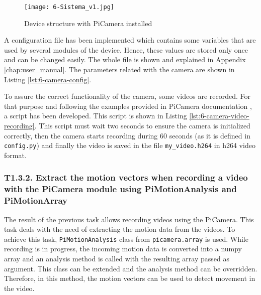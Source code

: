\begin{figure}[!h]
	\begin{center}
		\texttt{[image: 6-Sistema\_v1.jpg]}
		\caption{Device structure with PiCamera installed}
		\label{fig:6-Sistema_v1}
	\end{center}
\end{figure}

A configuration file has been implemented which contains some variables that are used by several modules of the device. Hence, these values are stored only once and can be changed easily. The whole file is shown and explained in Appendix \ref{chap:user_manual}. The parameters related with the camera are shown in Listing \ref{lst:6-camera-config}.



To assure the correct functionality of the camera, some videos are recorded. For that purpose and following the examples provided in PiCamera documentation \cite{PiCameraDoc}, a script has been developed. This script is shown in Listing \ref{lst:6-camera-video-recording}. This script must wait two seconds to ensure the camera is initialized correctly, then the camera starts recording during 60 seconds (as it is defined in \texttt{config.py}) and finally the video is saved in the file \texttt{my\_video.h264} in h264 video format.




\subsubsection{T1.3.2. Extract the motion vectors when recording a video with the PiCamera module using PiMotionAnalysis and PiMotionArray}
The result of the previous task allows recording videos using the PiCamera. This task deals with the need of extracting the motion data from the videos. To achieve this task, \texttt{PiMotionAnalysis} class from \texttt{picamera.array} is used. While recording is in progress, the incoming motion data is converted into a numpy array and an analysis method is called with the resulting array passed as argument. This class can be extended and the analysis method can be overridden. Therefore, in this method, the motion vectors can be used to detect movement in the video.

